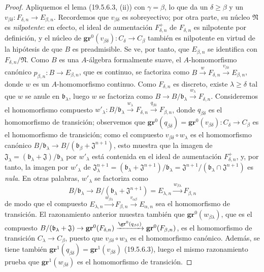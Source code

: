 \begin{proof}
Apliquemos el lema (19.5.6.3, (ii)) con $\gamma=\beta$, lo que da un
$\delta\geq\beta$ y un
$v_{\beta\delta}:F_{\delta,n}\to E_{\beta,n}$. Recordemos que
$v_{\beta\delta}$ es sobreyectivo; por otra parte, su núcleo $\mathfrak N$ es
\emph{nilpotente}: en efecto, el ideal de aumentación $F_{\delta,n}^+$ de
$F_{\delta,n}$ es nilpotente por definición, y el núcleo de
$\mathbf{gr}^0(v_{\beta\delta}):C_\delta\to C_\beta$ también es nilpotente en virtud de
la hipótesis de que $B$ es preadmisible. Se ve, por tanto, que $E_{\beta,n}$
se identifica con $F_{\delta,n}/\mathfrak N$. Como $B$ es una $A$-álgebra
formalmente suave, el $A$-homomorfismo canónico
$p_{\beta,n}:B\to E_{\beta,n}$, que es continuo, se factoriza como
$B\xrightarrow{w}F_{\delta,n}\xrightarrow{v_{\beta\delta}}E_{\beta,n}$, donde
$w$ es un $A$-homomorfismo continuo. Como $F_{\delta,n}$ es discreto, existe
$\lambda\geq\delta$ tal que $w$ se anule en $\mathfrak b_\lambda$, luego $w$
se factoriza como
$B\to B/\mathfrak b_\lambda\xrightarrow{w_\lambda}F_{\delta,n}$. Consideremos
el homomorfismo compuesto
$w'_\lambda:B/\mathfrak b_\lambda\xrightarrow{w_\lambda}F_{\delta,n}
\xrightarrow{q_{\beta\delta}}F_{\beta,n}$, donde $q_{\beta\delta}$ es
el homomorfismo de transición; observemos que
$\mathbf{gr}^0(q_{\beta\delta})=\mathbf{gr}^0(v_{\beta\delta}):C_\delta\to C_\beta$ es
el homomorfismo de transición; como el compuesto
$v_{\beta\delta}\circ w_\lambda$ es el homomorfismo
canónico $B/\mathfrak b_\lambda\to
B/(\mathfrak b_\beta+\mathfrak J^{n+1})$, esto muestra que la imagen de
$\mathfrak J_\lambda=(\mathfrak b_\lambda+\mathfrak J)/\mathfrak b_\lambda$
por $w'_\lambda$ está contenida en el ideal de aumentación
$F_{\delta,n}^+$, y, por tanto, la imagen por $w'_\lambda$ de
$\mathfrak J_\lambda^{n+1}=(\mathfrak b_\lambda+\mathfrak J^{n+1})/
\mathfrak b_\lambda=\mathfrak J^{n+1}/(\mathfrak b_\lambda\cap\mathfrak J^{n+1})$ es \emph{nula}. En otras palabras,
$w'_\lambda$ se factoriza como
\[
  B/\mathfrak b_\lambda\to
  B/(\mathfrak b_\lambda+\mathfrak J^{n+1})=E_{\lambda,n}
  \xrightarrow{w_{\beta\lambda}}F_{\beta,n}
\]
de modo que el compuesto
$E_{\lambda,n}\xrightarrow{w_{\beta\lambda}}F_{\beta,n}
\xrightarrow{v_{\alpha\beta}}E_{\alpha,n}$ sea el homomorfismo de transición.
El razonamiento anterior muestra también que $\mathbf{gr}^0(w_{\beta\lambda})$, que es
el compuesto
$B/(\mathfrak b_\lambda+\mathfrak J)\to\mathbf{gr}^0(F_{\delta,n})
\xrightarrow{\gr^0(q_{\beta\delta})}\mathbf{gr}^0(F_{\beta,n})$, es el homomorfismo
de transición $C_\lambda\to C_\beta$, puesto que
$v_{\beta\delta}\circ w_\lambda$ es el homomorfismo canónico. Además, se tiene también
$\mathbf{gr}^1(q_{\beta\delta})=\mathbf{gr}^1(v_{\beta\delta})$ (19.5.6.3), luego el mismo
razonamiento prueba que $\mathbf{gr}^1(w_{\beta\delta})$ es el homomorfismo de
transición.
\end{proof}

